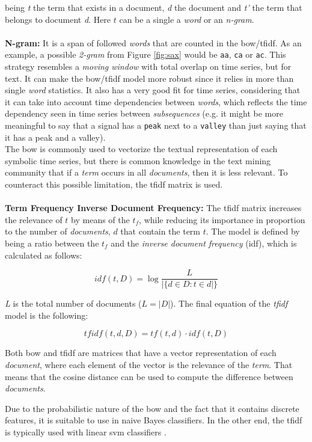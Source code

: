 being \textit{t} the term that exists in a document, \textit{d} the document and \textit{t'} the term that belongs to document \textit{d}. Here $t$ can be a single a \textit{word} or an \textit{n-gram}.\\\\
\textbf{N-gram:} It is a span of followed \textit{words} that are counted in the \gls{bow}/\gls{tfidf}. As an example, a possible \textit{2-gram} from Figure \ref{fig:sax} would be \texttt{aa}, \texttt{ca} or \texttt{ac}. This strategy resembles a \textit{moving window} with total overlap on time series, but for text. It can make the \gls{bow}/\gls{tfidf} model more robust since it relies in more than single \textit{word} statistics. It also has a very good fit for time series, considering that it can take into account time dependencies between \textit{words}, which reflects the time dependency seen in time series between \textit{subsequences} (e.g. it might be more meaningful to say that a signal has a \texttt{peak} next to a \texttt{valley} than just saying that it has a peak and a valley).\\

The \gls{bow} is commonly used to vectorize the textual representation of each symbolic time series, but there is common knowledge in the text mining community that if a \textit{term} occurs in all \textit{documents}, then it is less relevant. To counteract this possible limitation, the \gls{tfidf} matrix is used.\\\\
\textbf{Term Frequency Inverse Document Frequency:} The \gls{tfidf} matrix increases the relevance of $t$ by means of the $t_f$, while reducing its importance in proportion to the number of \textit{documents}, $d$ that contain the term $t$. The model is defined by being a ratio between the $t_f$ and the \textit{inverse document frequency} (idf), which is calculated as follows:

\begin{equation}
\label{eq:idf}
    idf(t, D) = \log{\frac{L}{|\{d \in D: t \in d|\}}}
\end{equation}

\textit{L} is the total number of documents ($L = |D|$). The final equation of the \textit{tfidf} model is the following:

\begin{equation}
\label{eqn:tfidf}
    tfidf(t, d, D) = tf(t, d) \cdot idf(t, D) 
\end{equation}

Both \gls{bow} and \gls{tfidf} are matrices that have a vector representation of each \textit{document}, where each element of the vector is the relevance of the \textit{term}. That means that the cosine distance can be used to compute the difference between \textit{documents}.
\par
Due to the probabilistic nature of the \gls{bow} and the fact that it contains discrete features, it is suitable to use in naive Bayes classifiers. In the other end, the \gls{tfidf} is typically used with linear \gls{svm} classifiers \cite{scikit-learn}.


